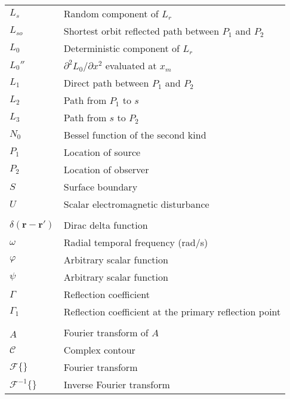 \begin{supertabular}{ll}
$L_s$ & Random component of $L_r$\\
$L_{so}$ & Shortest orbit reflected path between $P_1$ and $P_2$\\
$L_0$ & Deterministic component of $L_r$\\
$L_0''$ & $\partial^2 L_0 /\partial x^2$ evaluated at $x_m$\\
$L_1$ & Direct path between $P_1$ and $P_2$\\
$L_2$ & Path from $P_1$ to $s$\\
$L_3$ & Path from $s$ to $P_2$\\
$N_0$ & Bessel function of the second kind \\
$P_1$ & Location of source\\
$P_2$ & Location of observer\\
$S$ & Surface boundary \\
$U$ & Scalar electromagnetic disturbance\\
\\
$\delta\left(\mathbf{r}-\mathbf{r}' \right)$ & Dirac delta function \\
$\omega$ & Radial temporal frequency (rad/s)\\
$\varphi$ & Arbitrary scalar function\\
$\psi$ & Arbitrary scalar function\\
$\Gamma$ & Reflection coefficient\\
$\Gamma_1$ & Reflection coefficient at the primary reflection point\\
\\
$\hat{A}$ & Fourier transform of $A$ \\
$\mathcal{C}$ & Complex contour \\
$\mathcal{F}\{\}$ & Fourier transform \\
$\mathcal{F}^{-1}\{\}$ & Inverse Fourier transform \\
\end{supertabular}